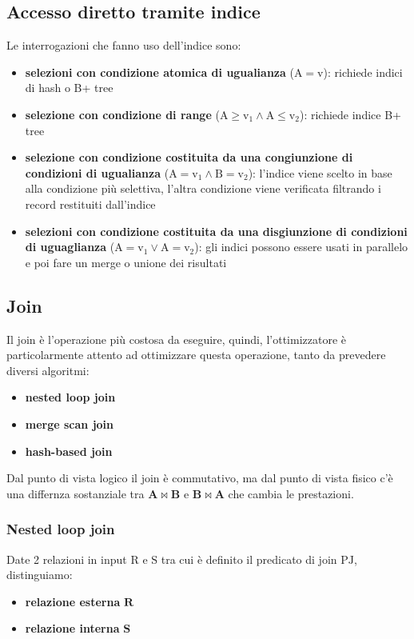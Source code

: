 \subsection{Accesso diretto tramite indice}
Le interrogazioni che fanno uso dell'indice sono:
\begin{itemize}[label=$\diamond$, itemsep=\smallskipamount]
    \item \textbf{selezioni con condizione atomica di ugualianza} ($\mathrm{A = v}$): richiede indici di hash o B+ tree
    \item \textbf{selezione con condizione di range} ($\mathrm{A \geq v_1 \land A \leq v_2}$): richiede indice B+ tree
    \item \textbf{selezione con condizione costituita da una congiunzione di condizioni di ugualianza} ($\mathrm{A = v_1 \land B = v_2}$): l'indice viene scelto in base alla condizione più selettiva, l'altra condizione viene verificata filtrando i record restituiti dall'indice
    \item \textbf{selezioni con condizione costituita da una disgiunzione di condizioni di uguaglianza} ($\mathrm{A = v_1 \lor A = v_2}$): gli indici possono essere usati in parallelo e poi fare un merge o unione dei risultati
\end{itemize}

\subsection{Join}
Il join è l'operazione più costosa da eseguire, quindi, l'ottimizzatore è particolarmente attento ad ottimizzare questa operazione, tanto da prevedere diversi algoritmi:
\begin{itemize}[label=$\triangleright$, itemsep=\smallskipamount]
    \item \textbf{nested loop join}
    \item \textbf{merge scan join}
    \item \textbf{hash-based join}
\end{itemize}

Dal punto di vista logico il join è commutativo, ma dal punto di vista fisico c'è una differnza sostanziale tra $\mathbf{A \bowtie B}$ e $\mathbf{B \bowtie A}$ che cambia le prestazioni.

\subsubsection{Nested loop join}
Date 2 relazioni in input $\mathrm{R}$ e $\mathrm{S}$ tra cui è definito il predicato di join $\mathrm{PJ}$, distinguiamo:
\begin{itemize}[label=$\circ$, itemsep=\smallskipamount]
    \item \textbf{relazione esterna} $\mathbf{R}$
    \item \textbf{relazione interna} $\mathbf{S}$
\end{itemize}

